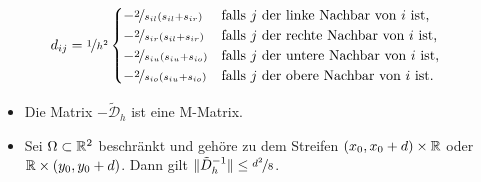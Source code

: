 \documentclass{cheat-sheet}
\newcommand{\DO}{\mathcal{D}} %
\begin{document}
\begin{verf}
\begin{align*}
    d_{ij} = \nicefrac{1}{h^2} & \begin{cases}
      - \nicefrac{2}{s_{il} (s_{il} + s_{ir})} & \text{falls $j$ der linke Nachbar von $i$ ist,} \\
      - \nicefrac{2}{s_{ir} (s_{il} + s_{ir})} & \text{falls $j$ der rechte Nachbar von $i$ ist,} \\
      - \nicefrac{2}{s_{iu} (s_{iu} + s_{io})} & \text{falls $j$ der untere Nachbar von $i$ ist,} \\
      - \nicefrac{2}{s_{io} (s_{iu} + s_{io})} & \text{falls $j$ der obere Nachbar von $i$ ist.} \\
    \end{cases}
  \end{align*}
\end{verf}

\begin{lem}
  \begin{itemize}
    \item Die Matrix $- \tilde{\DO}_h$ ist eine M-Matrix.
    \item Sei $\Omega \subset \mathbb{R}^2$ beschränkt und gehöre zu dem Streifen $(x_0, x_0 + d) \times \mathbb{R}$ oder $\mathbb{R} \times (y_0, y_0 + d)$.
    Dann gilt $\lVert\tilde{D}_h^{-1}\rVert \leq \nicefrac{d^2}{8}$.
  \end{itemize}
\end{lem}

\end{document}

